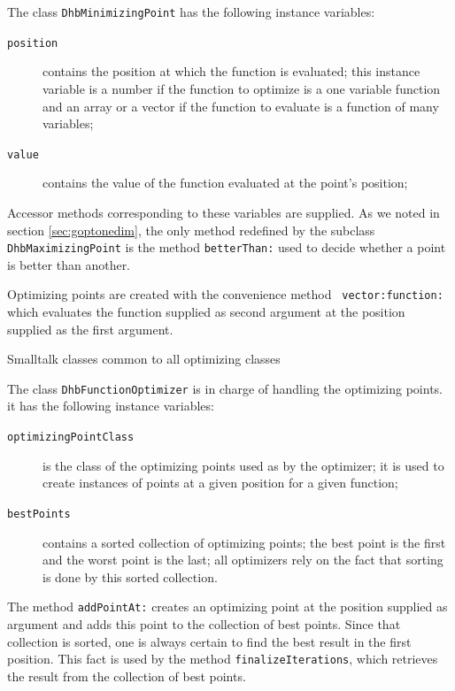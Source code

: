 \documentclass[twoside]{book}
\begin{document}
\noindent The class {\tt DhbMinimizingPoint} has the following
instance variables:
\begin{description}
  \item[\tt position] contains the position at which the function
  is evaluated; this instance variable is a number if the function
  to optimize is a one variable function and an array or a vector
  if the function to evaluate is a function of many variables;
  \item[\tt value] contains the value of the function evaluated at the point's position;
\end{description}
Accessor methods corresponding to these variables are supplied. As
we noted in section \ref{sec:goptonedim}, the only method
redefined by the subclass {\tt DhbMaximizingPoint} is the method
{\tt betterThan:} used to decide whether a point is better than
another.

Optimizing points are created with the convenience method {\tt
vector:function:} which evaluates the function supplied as second
argument at the position supplied as the first argument.
\begin{listing} Smalltalk classes common to all optimizing classes \label{ls:optimizerCommon}


\end{listing}

The class {\tt DhbFunctionOptimizer} is in charge of handling the
optimizing points. it has the following instance variables:
\begin{description}
  \item[\tt optimizingPointClass] is the class of the optimizing
  points used as  by the optimizer; it is used
  to create instances of points at a given position for a given
  function;
  \item[\tt bestPoints] contains a sorted collection of optimizing
  points; the best point is the first and the worst point is the
  last; all optimizers rely on the fact that sorting is done by this sorted collection.
\end{description}
The method {\tt addPointAt:} creates an optimizing point at the
position supplied as argument and adds this point to the
collection of best points. Since that collection is sorted, one is
always certain to find the best result in the first position. This
fact is used by the method {\tt finalizeIterations}, which
retrieves the result from the collection of best points.
\end{document}
